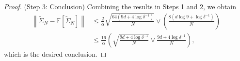 \documentclass[12pt,reqno]{amsart}
\theoremstyle{remark}
\theoremstyle{definition}
\newcommand{\E}{\mathbb{E}}
\begin{document}
\begin{proof}
    (Step 3: Conclusion) Combining the results in Steps 1 and 2, we obtain 
    \begin{align*}
        \left\|\tilde{\Sigma}_{N}-\E\left[\tilde{\Sigma}_{N}\right]\right\|
        &\le \frac{2}{\alpha}\sqrt{\frac{64(9d+4\log\delta^{-1})}{N}}\vee \left(\frac{8(d\log9+\log\delta^{-1})}{N}\right)\\
        &\le \frac{16}{\alpha}\left(\sqrt{\frac{9d+4\log\delta^{-1}}{N}}\vee \frac{9d+4\log\delta^{-1}}{N}\right),
    \end{align*}
    which is the desired conclusion.
\end{proof}
\end{document}
